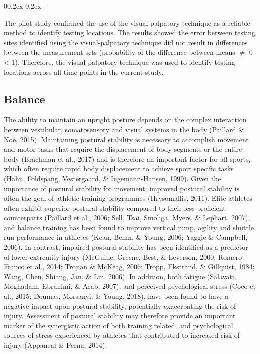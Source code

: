 \documentclass[
  english,
  man,floatsintext]{apa6}
\makeatletter
\renewcommand{\subparagraph}[1]{\@startsection{subparagraph}{5}{1em}%
  {0\baselineskip \@plus 0.2ex \@minus 0.2ex}%
  {-\z@\relax}%
  {\normalfont\normalsize\itshape\hspace{\parindent}{#1}\textit{\addperi}}{\relax}}
\makeatother
\begin{document}
\hypertarget{summary}{%
\subparagraph{Summary}\label{summary}}

The pilot study confirmed the use of the visual-palpatory technique as a reliable method to identify testing locations.
The results showed the error between testing sites identified using the visual-palpatory technique did not result in differences between the measurement sets (probability of the difference between means \(\neq\) 0 \textless{} 1).
Therefore, the visual-palpatory technique was used to identify testing locations across all time points in the current study.

\hypertarget{balance}{%
\subsection{Balance}\label{balance}}

The ability to maintain an upright posture depends on the complex interaction between vestibular, somatosensory and visual systems in the body (Paillard \& Noé, 2015).
Maintaining postural stability is necessary to accomplish movement and motor tasks that require the displacement of body segments or the entire body (Brachman et al., 2017) and is therefore an important factor for all sports, which often require rapid body displacement to achieve sport specific tasks (Hahn, Foldspang, Vestergaard, \& Ingemann-Hansen, 1999).
Given the importance of postural stability for movement, improved postural stability is often the goal of athletic training programmes (Hrysomallis, 2011). Elite athletes often exhibit superior postural stability compared to their less proficient counterparts (Paillard et al., 2006; Sell, Tsai, Smoliga, Myers, \& Lephart, 2007), and balance training has been found to improve vertical jump, agility and shuttle run performance in athletes (Kean, Behm, \& Young, 2006; Yaggie \& Campbell, 2006).
In contrast, impaired postural stability has been identified as a predictor of lower extremity injury (McGuine, Greene, Best, \& Leverson, 2000; Romero-Franco et al., 2014; Trojian \& McKeag, 2006; Tropp, Ekstrand, \& Gillquist, 1984; Wang, Chen, Shiang, Jan, \& Lin, 2006).
In addition, both fatigue (Salavati, Moghadam, Ebrahimi, \& Arab, 2007), and perceived psychological stress
(Coco et al., 2015; Doumas, Morsanyi, \& Young, 2018), have been found to have a negative impact upon postural stability, potentially exacerbating the risk of injury.
Assessment of postural stability may therefore provide an important marker of the synergistic action of both training related, and psychological sources of stress experienced by athletes that contributed to increased risk of injury (Appaneal \& Perna, 2014).
\end{document}
